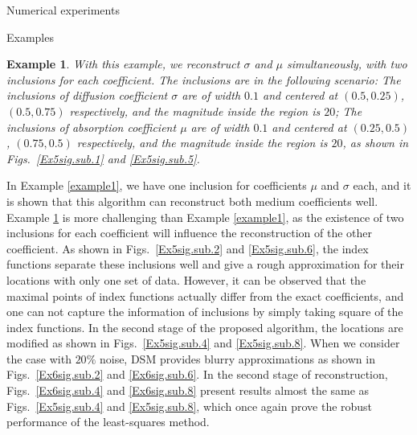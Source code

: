 \documentclass[11pt]{article}%
\renewcommand{\_}{{\fontfamily{ptm}\selectfont\textunderscore}}
\theoremstyle{plain}
\numberwithin{equation}{section}
\newtheorem{exam}{Example}
\begin{document}
\begin{section}{Numerical experiments}
\begin{subsection}{Examples}
\begin{exam}\label{example3} 
With this example, we reconstruct $\sigma$ and $\mu$ simultaneously, with two inclusions for each coefficient. The inclusions are in the following scenario: The inclusions of diffusion coefficient $\sigma$ are of width $0.1$ and centered at $(0.5,0.25)$, $(0.5,0.75)$ respectively, and the magnitude inside the region is $20$; The inclusions of absorption coefficient $\mu$ are of width $0.1$ and centered at $(0.25,0.5)$, $(0.75,0.5)$ respectively, and the magnitude inside the region is $20$, as shown in Figs.~\ref{Ex5sig.sub.1} and \ref{Ex5sig.sub.5}.
\end{exam}
 In Example \ref{example1}, we have one inclusion for coefficients $\mu$ and $\sigma$ each, and it is shown that this algorithm can reconstruct both medium coefficients well. Example \ref{example3} is more challenging than Example \ref{example1}, as the existence of two inclusions for each coefficient will influence the reconstruction of the other coefficient. As shown in Figs.~\ref{Ex5sig.sub.2} and \ref{Ex5sig.sub.6}, the index functions separate these inclusions well  and give a rough approximation for their locations with only one set of data. However, it can be observed that the maximal points of index functions  actually differ from the exact coefficients, and one can not capture the information of inclusions by simply taking square of the index functions. In the second stage of the proposed algorithm, the locations are modified as shown in Figs.~\ref{Ex5sig.sub.4} and \ref{Ex5sig.sub.8}. When we consider the case with $20\%$ noise, DSM provides blurry  approximations as shown in Figs.~\ref{Ex6sig.sub.2} and \ref{Ex6sig.sub.6}.
  In the second stage of reconstruction, Figs.~\ref{Ex6sig.sub.4} and \ref{Ex6sig.sub.8} present results almost the same as Figs.~\ref{Ex5sig.sub.4} and \ref{Ex5sig.sub.8}, which once again prove the robust performance of the least-squares method. 
\begin{figure}[ht!]
\centering
{}

\end{figure}
\end{subsection}
\end{section}
\end{document}
